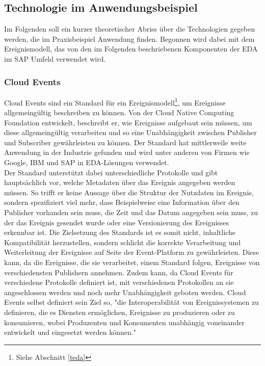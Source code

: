 \subsection{Technologie im Anwendungsbeispiel}
Im Folgenden soll ein kurzer theoretischer Abriss über die Technologien gegeben werden, die im Praxisbeispiel Anwendung finden. Begonnen wird dabei mit dem Ereignismodell, das von den im Folgenden beschriebenen Komponenten der \ac{EDA} im SAP Umfeld verwendet wird.

\subsubsection*{Cloud Events}
\label{cloudev}
Cloud Events sind ein Standard für ein Ereignismodell\footnote{Siehe Abschnitt \ref*{teda}}, um Ereignisse allgemeingültig beschreiben zu können. Von der Cloud Native Computing Foundation entwickelt, beschreibt er, wie Ereignisse aufgebaut sein müssen, um diese allgemeingültig verarbeiten und so eine Unabhängigkeit zwischen Publisher und Subscriber gewährleisten zu können. Der Standard hat mittlerweile weite Anwendung in der Industrie gefunden und wird unter anderen von Firmen wie Google, IBM und SAP in \ac{EDA}-Lösungen verwendet. \cite[Vgl. ][]{cloudevent} \\
Der Standard unterstützt dabei unterschiedliche Protokolle und gibt hauptsächlich vor, welche Metadaten über das Ereignis angegeben werden müssen. So trifft er keine Aussage über die Struktur der Nutzdaten im Ereignis, sondern spezifiziert viel mehr, dass Beispielweise eine Information über den Publisher vorhanden sein muss, die Zeit und das Datum angegeben sein muss, zu der das Ereignis gesendet wurde oder eine Versionierung des Ereignisses erkennbar ist. Die Zielsetzung des Standards ist es somit nicht, inhaltliche Kompatibilität herzustellen, sondern schlicht die korrekte Verarbeitung und Weiterleitung der Ereignisse auf Seite der Event-Platform zu gewährleisten. Diese kann, da die Ereignisse, die sie verarbeitet, einem Standard folgen, Ereignisse von verschiedensten Publishern annehmen. Zudem kann, da Cloud Events für verschiedene Protokolle definiert ist, mit verschiedenen Protokollen an sie angeschlossen werden und noch mehr Unabhängigkeit geboten werden. Cloud Events selbst definiert sein Ziel so, "die Interoperabilität von Ereignissystemen zu definieren, die es Diensten ermöglichen, Ereignisse zu produzieren oder zu konsumieren, wobei Produzenten und Konsumenten unabhängig voneinander entwickelt und eingesetzt werden können."\ \cite[Vgl. ][]{cloudeventprimer}

